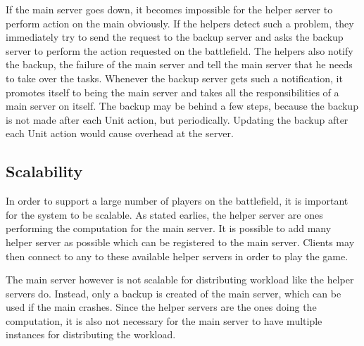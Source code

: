 If the main server goes down, it becomes impossible for the helper server to perform action on the main obviously.
If the helpers detect such a problem, they immediately try to send the request to the backup server and asks the backup server to perform the action requested on the battlefield.
The helpers also notify the backup, the failure of the main server and tell the main server that he needs to take over the tasks.
Whenever the backup server gets such a notification, it promotes itself to being the main server and takes all the responsibilities of a main server on itself.
The backup may be behind a few steps, because the backup is not made after each Unit action, but periodically. 
Updating the backup after each Unit action would cause overhead at the server.

\subsection{Scalability}
In order to support a large number of players on the battlefield, it is important for the system to be scalable.
As stated earlies, the helper server are ones performing the computation for the main server.
It is possible to add many helper server as possible which can be registered to the main server.
Clients may then connect to any to these available helper servers in order to play the game.

The main server however is not scalable for distributing workload like the helper servers do. 
Instead, only a backup is created of the main server, which can be used if the main crashes.
Since the helper servers are the ones doing the computation, it is also not necessary for the main server to have multiple instances for distributing the workload.
 
